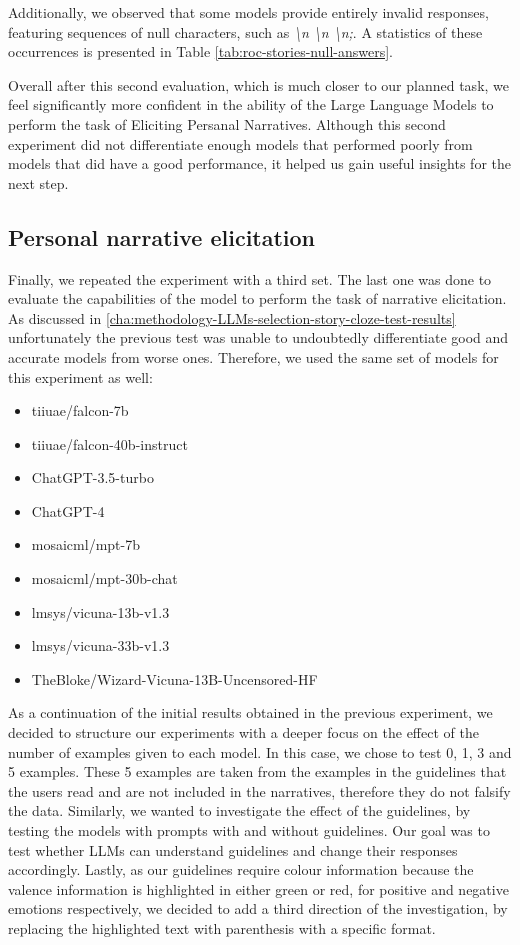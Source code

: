 Additionally, we observed that some models provide entirely invalid responses, featuring sequences of null characters, such as \emph{\textbackslash n \textbackslash n \textbackslash n;}. A statistics of these occurrences is presented in Table \ref{tab:roc-stories-null-answers}.

Overall after this second evaluation, which is much closer to our planned task, we feel significantly more confident in the ability of the Large Language Models to perform the task of Eliciting Persanal Narratives. Although this second experiment did not differentiate enough models that performed poorly from models that did have a good performance, it helped us gain useful insights for the next step.

\subsection{Personal narrative elicitation}
\label{cha:methodology-personal-narrative-elicitation}
Finally, we repeated the experiment with a third set. The last one was done to evaluate the capabilities of the model to perform the task of narrative elicitation. As discussed in \ref{cha:methodology-LLMs-selection-story-cloze-test-results} unfortunately the previous test was unable to undoubtedly differentiate good and accurate models from worse ones. Therefore, we used the same set of models for this experiment as well:
\begin{itemize}
    \item   tiiuae/falcon-7b
    \item   tiiuae/falcon-40b-instruct
    \item   ChatGPT-3.5-turbo
    \item   ChatGPT-4
    \item   mosaicml/mpt-7b
    \item   mosaicml/mpt-30b-chat
    \item   lmsys/vicuna-13b-v1.3
    \item   lmsys/vicuna-33b-v1.3
    \item   TheBloke/Wizard-Vicuna-13B-Uncensored-HF
\end{itemize}
As a continuation of the initial results obtained in the previous experiment, we decided to structure our experiments with a deeper focus on the effect of the number of examples given to each model. In this case, we chose to test 0, 1, 3 and 5 examples. These 5 examples are taken from the examples in the guidelines that the users read and are not included in the narratives, therefore they do not falsify the data. Similarly, we wanted to investigate the effect of the guidelines, by testing the models with prompts with and without guidelines. Our goal was to test whether LLMs can understand guidelines and change their responses accordingly. Lastly, as our guidelines require colour information because the valence information is highlighted in either green or red, for positive and negative emotions respectively, we decided to add a third direction of the investigation, by replacing the highlighted text with parenthesis with a specific format.

